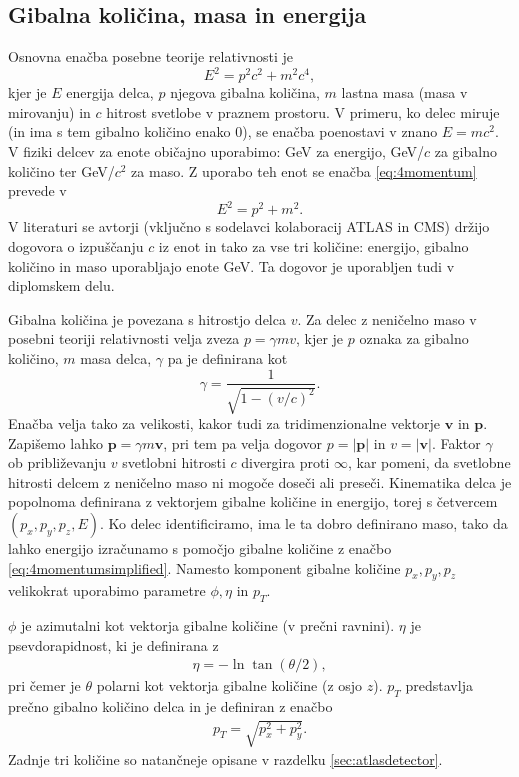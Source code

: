 \documentclass[11pt,a4paper,openany]{book}
\begin{document}
\subsection{Gibalna količina, masa in energija}
Osnovna enačba posebne teorije relativnosti je
\begin{equation}
	E^2 = p^2c^2 + m^2c^4,
	\label{eq:4momentum}
\end{equation}
kjer je $E$ energija delca, $p$ njegova gibalna količina, $m$ lastna masa (masa v mirovanju) in $c$ hitrost svetlobe v praznem prostoru. V primeru, ko delec miruje (in ima s tem gibalno količino enako $0$), se enačba poenostavi v znano $E = mc^2$. V fiziki delcev za enote običajno uporabimo: GeV za energijo, GeV/$c$ za gibalno količino ter GeV/$c^2$ za maso. Z uporabo teh enot se enačba \ref{eq:4momentum} prevede v 
\begin{equation}
	E^2 = p^2 + m^2.
	\label{eq:4momentumsimplified}
\end{equation}
V literaturi se avtorji (vključno s sodelavci kolaboracij ATLAS in CMS) držijo dogovora o izpuščanju $c$ iz enot in tako za vse tri količine: energijo, gibalno količino in maso uporabljajo enote GeV. Ta dogovor je uporabljen tudi v diplomskem delu.

Gibalna količina je povezana s hitrostjo delca $v$.  Za delec z neničelno maso v posebni teoriji relativnosti velja zveza $p = \gamma m v$, kjer je $p$ oznaka za gibalno količino, $m$ masa delca, $\gamma$ pa je definirana kot
\begin{equation}
	\gamma = \frac{1}{\sqrt{1 - (v/c)^2}}.
	\label{eq:gamma}
\end{equation}
Enačba velja tako za velikosti, kakor tudi za tridimenzionalne vektorje $\mathbf{v}$ in $\mathbf{p}$. Zapišemo lahko $\mathbf{p} = \gamma m \mathbf{v}$, pri tem pa velja dogovor $p = |\mathbf{p}|$ in $v = |\mathbf{v}|$. Faktor $\gamma$ ob približevanju $v$ svetlobni hitrosti $c$ divergira proti $\infty$, kar pomeni, da svetlobne hitrosti delcem z neničelno maso ni mogoče doseči ali preseči. Kinematika delca je popolnoma definirana z vektorjem gibalne količine in energijo, torej s četvercem $(p_x, p_y, p_z, E)$. Ko delec identificiramo, ima le ta dobro definirano maso, tako da lahko energijo izračunamo s pomočjo gibalne količine z enačbo \ref{eq:4momentumsimplified}. Namesto komponent gibalne količine $p_x, p_y, p_z$ velikokrat uporabimo parametre $\phi, \eta$ in $p_T$.

$\phi$ je azimutalni kot vektorja gibalne količine (v prečni ravnini). $\eta$ je psevdorapidnost, ki je definirana z
\begin{eqnarray}
	\eta = -\ln \tan(\theta/2),
	\label{eq:pseudorapidity}
\end{eqnarray}
pri čemer je $\theta$ polarni kot vektorja gibalne količine (z osjo $z$). $p_T$ predstavlja prečno gibalno količino delca in je definiran z enačbo
\begin{eqnarray}
	p_T = \sqrt{p_x^2 + p_y^2}.
	\label{eq:transversemomentum}
\end{eqnarray}
Zadnje tri količine so natančneje opisane v razdelku \ref{sec:atlasdetector}.
\end{document}

